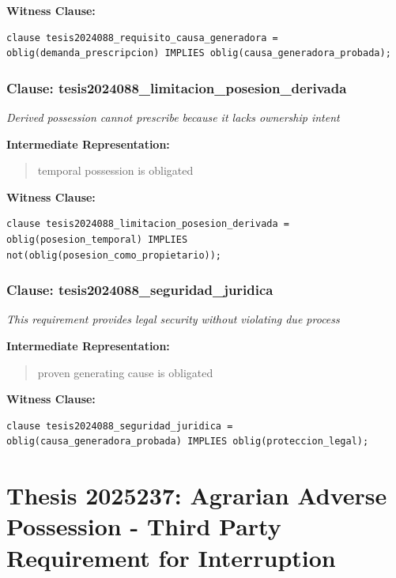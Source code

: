 \documentclass[11pt,a4paper]{article}
\begin{document}
\textbf{Witness Clause:}

\begin{lstlisting}[style=witnessstyle, language=Witness]
clause tesis2024088_requisito_causa_generadora = oblig(demanda_prescripcion) IMPLIES oblig(causa_generadora_probada);
\end{lstlisting}

\subsubsection{Clause: tesis2024088\_limitacion\_posesion\_derivada}

\textit{Derived possession cannot prescribe because it lacks ownership intent}

\textbf{Intermediate Representation:}

\begin{quote}
temporal possession is obligated
\end{quote}

\textbf{Witness Clause:}

\begin{lstlisting}[style=witnessstyle, language=Witness]
clause tesis2024088_limitacion_posesion_derivada = oblig(posesion_temporal) IMPLIES not(oblig(posesion_como_propietario));
\end{lstlisting}

\subsubsection{Clause: tesis2024088\_seguridad\_juridica}

\textit{This requirement provides legal security without violating due process}

\textbf{Intermediate Representation:}

\begin{quote}
proven generating cause is obligated
\end{quote}

\textbf{Witness Clause:}

\begin{lstlisting}[style=witnessstyle, language=Witness]
clause tesis2024088_seguridad_juridica = oblig(causa_generadora_probada) IMPLIES oblig(proteccion_legal);
\end{lstlisting}

\newpage

\section{Thesis 2025237: Agrarian Adverse Possession - Third Party Requirement for Interruption}
\label{thesis:2025237}
\end{document}
